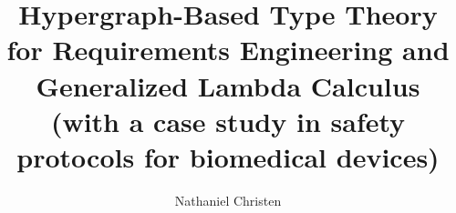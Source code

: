 \documentclass[11pt,twocolumn]{article}
\begin{document}
\title{Hypergraph-Based Type Theory for Requirements Engineering and
Generalized Lambda Calculus (with a case study in safety protocols 
for biomedical devices)}
\author{Nathaniel Christen}
\twocolumn[\begin{@twocolumnfalse}
\maketitle{}
\begin{abstract}\end{abstract}
\decoline{}
\vspace{3em}
\end{@twocolumnfalse}]









%


\end{document}
